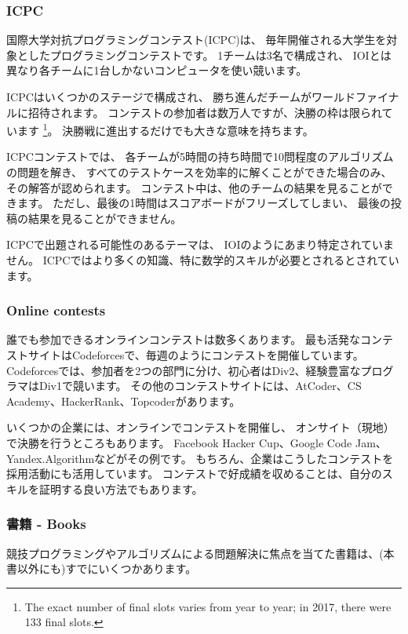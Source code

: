 \subsubsection{ICPC}

国際大学対抗プログラミングコンテスト(ICPC)は、
毎年開催される大学生を対象としたプログラミングコンテストです。
1チームは3名で構成され、
IOIとは異なり各チームに1台しかないコンピュータを使い競います。

ICPCはいくつかのステージで構成され、
勝ち進んだチームがワールドファイナルに招待されます。
コンテストの参加者は数万人ですが、決勝の枠は限られています
\footnote{The exact number of final
slots varies from year to year; in 2017, there were 133 final slots.}。
決勝戦に進出するだけでも大きな意味を持ちます。

ICPCコンテストでは、
各チームが5時間の持ち時間で10問程度のアルゴリズムの問題を解き、
すべてのテストケースを効率的に解くことができた場合のみ、その解答が認められます。
コンテスト中は、他のチームの結果を見ることができます。
ただし、最後の1時間はスコアボードがフリーズしてしまい、 最後の投稿の結果を見ることができません。

ICPCで出題される可能性のあるテーマは、
IOIのようにあまり特定されていません。
ICPCではより多くの知識、特に数学的スキルが必要とされるとされています。

\subsubsection{Online contests}

誰でも参加できるオンラインコンテストは数多くあります。
最も活発なコンテストサイトはCodeforcesで、毎週のようにコンテストを開催しています。
Codeforcesでは、参加者を2つの部門に分け、初心者はDiv2、経験豊富なプログラマはDiv1で競います。
その他のコンテストサイトには、AtCoder、CS Academy、HackerRank、Topcoderがあります。

いくつかの企業には、オンラインでコンテストを開催し、
オンサイト（現地）で決勝を行うところもあります。
Facebook Hacker Cup、Google Code Jam、Yandex.Algorithmなどがその例です。
もちろん、企業はこうしたコンテストを採用活動にも活用しています。
コンテストで好成績を収めることは、自分のスキルを証明する良い方法でもあります。

\subsubsection{書籍 - Books}

競技プログラミングやアルゴリズムによる問題解決に焦点を当てた書籍は、(本書以外にも)すでにいくつかあります。

